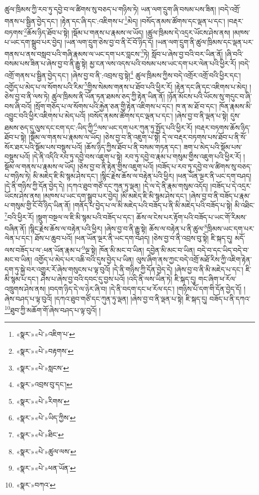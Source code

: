 ཚུལ་ཁྲིམས་ཀྱི་རབ་ཏུ་དབྱེ་བ་ལ་ཚིགས་སུ་བཅད་པ་གཉིས་ཏེ། ཡན་ལག་དྲུག་ཞི་བསམ་པས་ཟིན། །བདེ་འགྲོ་གནས་པ་སྦྱིན་བྱེད་དང་། །རྟེན་དང་ཞི་དང་:འཇིགས་པ་\footnote{«སྣར་»«པེ་»འཇིག་པ་}མེད། །བསོད་ནམས་ཚོགས་དང་ལྡན་པ་དང་། །བརྡར་བཏགས་\footnote{«སྣར་»«པེ་»བརྟགས་}ཆོས་ཉིད་ཐོབ་པ་སྟེ། །སྡོམ་པ་གནས་པ་རྣམས་ལ་ཡོད། །ཚུལ་ཁྲིམས་དེ་འདྲར་ཡོངས་ཤེས་ནས། །མཁས་པ་ཡང་དག་སྒྲུབ་པར་བྱེད། །ཡན་ལག་དྲུག་ཅེས་བྱ་བ་ནི་ངོ་བོ་ཉིད་དོ། །ཡན་ལག་དྲུག་ནི་ཚུལ་ཁྲིམས་དང་ལྡན་པར་གནས་པ་ནས་བསླབ་པའི་གཞི་རྣམས་ལ་ཡང་དག་པར་བླངས་\footnote{«སྣར་»«པེ་»སླངས་}ཏེ། སློབ་པ་ཞེས་བྱ་བའི་བར་ཡིན་ནོ། །ཞི་བའི་བསམ་པས་ཟིན་པ་ཞེས་བྱ་བ་ནི་རྒྱུ་སྟེ། མྱ་ངན་ལས་འདས་པའི་བསམ་པས་ཡང་དག་པར་ལེན་པའི་ཕྱིར་རོ། །བདེ་འགྲོ་གནས་པ་སྦྱིན་བྱེད་དང་། །ཞེས་བྱ་བ་ནི་:འབྲས་བུ་སྟེ།\footnote{«སྣར་»འབྲས་བུ་དང་།} ཚུལ་ཁྲིམས་ཀྱིས་བདེ་འགྲོར་འགྲོ་བའི་ཕྱིར་དང་། འགྱོད་པ་མེད་པ་ལ་སོགས་པའི་རིམ་\footnote{«སྣར་»«པེ་»རིགས་}གྱིས་སེམས་གནས་པ་ཐོབ་པའི་ཕྱིར་རོ། །རྟེན་དང་ཞི་དང་འཇིགས་པ་མེད། །ཅེས་བྱ་བ་ནི་ལས་ཏེ། ཚུལ་ཁྲིམས་ནི་ཡོན་ཏན་ཐམས་ཅད་ཀྱི་རྟེན་ཡིན་ནོ། །ཉོན་མོངས་པའི་ཡོངས་སུ་གདུང་བ་ཞི་བས་ཞི་བའོ། །སྲོག་གཅོད་པ་ལ་སོགས་པའི་རྐྱེན་ཅན་གྱི་རྟེན་འཇིགས་པ་དང་། ཁ་ན་མ་ཐོ་བ་དང་། ཁོན་རྣམས་མི་འབྱུང་བའི་ཕྱིར་འཇིགས་པ་མེད་པའོ། །བསོད་ནམས་ཚོགས་དང་ལྡན་པ་དང་། །ཞེས་བྱ་བ་ནི་ལྡན་པ་སྟེ། དུས་ཐམས་ཅད་དུ་ལུས་དང་ངག་དང་:ཡིད་ཀྱི་\footnote{«སྣར་»«པེ་»ཡིད་ཀྱིས་}ལས་ཡང་དག་པར་ཀུན་ཏུ་སྤྱོད་པའི་ཕྱིར་རོ། །བརྡར་བཏགས་ཆོས་ཉིད་ཐོབ་པ་སྟེ། །སྡོམ་ལ་གནས་པ་རྣམས་ལ་ཡོད། །ཅེས་བྱ་བ་ནི་འཇུག་པ་སྟེ། དེ་ལ་བརྡར་བཏགས་པས་ཐོབ་པ་ནི་སོ་སོར་ཐར་པའི་སྡོམ་པས་བསྡུས་པའོ། །ཆོས་ཉིད་ཀྱིས་ཐོབ་པ་ནི་བསམ་གཏན་དང་། ཟག་པ་མེད་པའི་སྡོམ་པས་བསྡུས་པའོ། །དེ་ནི་འདིའི་རབ་ཏུ་དབྱེ་བས་འཇུག་པ་སྟེ། རབ་ཏུ་དབྱེ་བ་རྣམ་པ་གསུམ་གྱིས་འཇུག་པའི་ཕྱིར་རོ། །སྡོམ་ལ་གནས་པ་རྣམས་ལ་ཡོད། །ཅེས་བྱ་བ་ནི་རྟེན་གྱིས་འཇུག་པའོ། །བཟོད་པ་རབ་ཏུ་དབྱེ་བ་ལ་ཚིགས་སུ་བཅད་པ་གཉིས་ཏེ། མི་མཇེད་ཇི་མི་སྙམ་ཤེས་དང་། །སྙིང་རྗེས་ཆོས་ལ་བརྟེན་པའི་ཕྱིར། །ཕན་ཡོན་ལྔར་ནི་ཡང་དག་བཤད། །དེ་ནི་གཉིས་ཀྱི་དོན་བྱེད་དེ། །དཀའ་ཐུབ་གཙོ་དང་ཀུན་ཏུ་ལྡན། །དེ་ལ་དེ་ནི་རྣམ་གསུམ་འདོད། །བཟོད་པ་དེ་འདྲར་ཡོངས་ཤེས་ནས། །མཁས་པ་ཡང་དག་སྒྲུབ་པར་བྱེད། །མི་མཇེད་ཇི་མི་སྙམ་ཤེས་དང་། །ཞེས་བྱ་བ་ནི་བཟོད་པ་རྣམ་པ་གསུམ་གྱི་ངོ་བོ་ཉིད་ཡིན་ནོ། །གནོད་པ་བྱེད་པ་ལ་མི་མཇེད་པའི་བཟོད་པ་ནི་མི་མཇེད་པའི་བཟོད་པ་སྟེ། མི་འཐིང་\footnote{«སྣར་»«པེ་»ཐིང་}བའི་ཕྱིར་རོ། །སྡུག་བསྔལ་ལ་ཇི་མི་སྙམ་པའི་བཟོད་པ་དང་། ཆོས་ལ་ངེས་པར་རྟོག་པའི་བཟོད་པ་ཡང་གོ་རིམས་བཞིན་ནོ། །སྙིང་རྗེས་ཆོས་ལ་བརྟེན་པའི་ཕྱིར། །ཞེས་བྱ་བ་ནི་རྒྱུ་སྟེ། ཆོས་ལ་བརྟེན་པ་ནི་ཚུལ་\footnote{«སྣར་»«པེ་»ཚུལ་ལས་}ཁྲིམས་ཡང་དག་པར་ལེན་པ་དང་། ཐོས་པ་ཆུབ་པའོ། །ཕན་ཡོན་ལྔར་ནི་ཡང་དག་བཤད། །ཅེས་བྱ་བ་ནི་འབྲས་བུ་སྟེ། ཇི་སྐད་དུ། མདོ་ལས་བཟོད་པ་ལ་:ཕན་ཡོན་རྣམ་པ་\footnote{«སྣར་»«པེ་»ཕན་ཡོན་}ལྔ་སྟེ། ཁོན་མི་མང་བ་ཡིན། དབྱེན་མི་མང་བ་ཡིན། བདེ་བ་དང་ཡིད་བདེ་བ་མང་བ་ཡིན། འགྱོད་པ་མེད་པར་འཆི་བའི་དུས་བྱེད་པ་ཡིན། ལུས་ཞིག་ནས་ཀྱང་བདེ་འགྲོ་མཐོ་རིས་ཀྱི་འཇིག་རྟེན་དག་ཏུ་སྐྱེ་བར་འགྱུར་རོ་ཞེས་གསུངས་པ་ལྟ་བུའོ། །དེ་ནི་གཉིས་ཀྱི་དོན་བྱེད་དེ། །ཞེས་བྱ་བ་ནི་མི་མཇེད་པ་དང་། ཇི་མི་སྙམ་པ་དང་། ཤེས་པ་ཞེས་བྱ་བའི་དབང་དུ་བྱས་པའོ། །འདི་ནི་ལས་ཡིན་ཏེ། ཇི་སྐད་དུ། གང་ཞིག་ཕ་རོལ་འཁྲུགས་ཤེས་ནས། །བདག་ཉིད་དེ་ལ་ཉེར་ཞི་བ། །དེ་ནི་བདག་དང་ཕ་རོལ་དང་། །གཉིས་པོ་དག་གི་དོན་བྱེད་དོ། །ཞེས་བཤད་པ་ལྟ་བུའོ། །དཀའ་ཐུབ་གཙོ་དང་ཀུན་ཏུ་ལྡན། །ཞེས་བྱ་བ་ནི་ལྡན་པ་སྟེ། ཇི་སྐད་དུ། བཟོད་པ་ནི་དཀའ་\footnote{«སྣར་»བཀའ་}ཐུབ་ཀྱི་མཆོག་གོ་ཞེས་བཤད་པ་ལྟ་བུའོ། །

